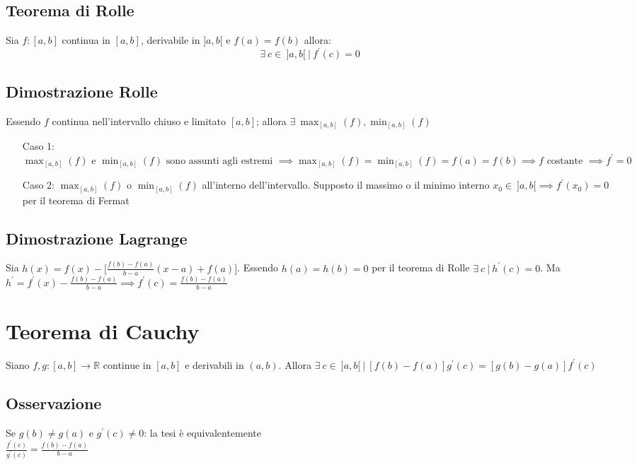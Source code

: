 \subsection{Teorema di Rolle}
Sia $f: [a,b]$ continua in $[a,b]$, derivabile in $]a,b[$ e $f(a) = f(b)$ allora:
\begin{equation}
\exists\ c \in\ ]a,b[\ |\ f^{\prime}(c) = 0
\end{equation}
\subsection{Dimostrazione Rolle}
Essendo $f$ continua nell'intervallo chiuso e limitato $[a,b]$; allora $\exists\ \displaystyle \max_{[a,b]}(f), \min_{[a,b]}(f)$
\begin{enumerate}
\item[Caso 1:] $\displaystyle \max_{[a,b]}(f) \text{ e } \min_{[a,b]}(f) \text{ sono assunti agli estremi } \implies \max_{[a,b]}(f) = \min_{[a,b]}(f) = f(a) = f(b) \implies f \text{ costante } \implies f^{\prime} = 0$
\item[Caso 2:] $\displaystyle \max_{[a,b]}(f) \text{ o } \min_{[a,b]}(f)$ all'interno dell'intervallo. Supposto il massimo o il minimo interno $x_0 \in\ ]a,b[ \implies f^{\prime}(x_0) = 0$ per il teorema di Fermat
\end{enumerate}
\subsection{Dimostrazione Lagrange}
Sia $h(x) = f(x) - \biggl [\frac{f(b) - f(a)}{b - a}(x-a) + f(a) \biggl ]$. Essendo $h(a) = h(b) = 0$ per il teorema di Rolle $\exists\ c\ |\ h^{\prime}(c) = 0$. Ma $h^{\prime} = f^{\prime}(x) - \frac{f(b) - f(a)}{b - a} \implies f^{\prime}(c) = \frac{f(b) - f(a)}{b - a}$

\section{Teorema di Cauchy}
Siano $f,g: [a,b] \to \mathbb{R}$ continue in $[a,b]$ e derivabili in $(a,b)$. Allora $\exists\ c \in\ ]a,b[\ |\ [f(b) - f(a)]g^{\prime}(c) = [g(b) - g(a)]f^{\prime}(c) $
\subsection{Osservazione}
Se $g(b) \neq g(a)$ e $g^{\prime}(c) \neq 0$: la tesi è equivalentemente\\
$\frac{f^{\prime}(c)}{g^{\prime}(c)} = \frac{f(b) - f(a)}{b - a}$